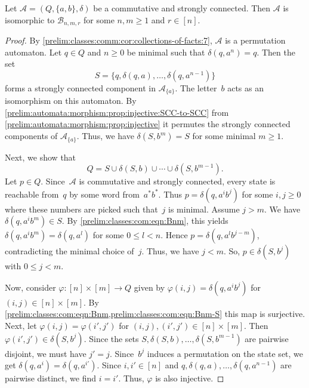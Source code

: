 \begin{proposition} \label{prelim:classes:com:prop:comm-perm-classifiy0}
	Let $\mathcal A = (Q, \{a,b\}, \delta)$ be a commutative and strongly connected.
	Then $\mathcal A$ is isomorphic to 
	$\mathcal B_{n,m,r}$ for some $n,m \ge 1$
	and $r \in [n]$.
\end{proposition}
\begin{proof}
	By \cref{prelim:classes:comm:cor:collections-of-facts:7}, $\mathcal A$
	is a permutation automaton.
	Let $q \in Q$
	and $n \ge 0$ be minimal
	such that $\delta(q, a^n) = q$.
	Then the set 
	\begin{equation}\label{prelim:classes:com:eqn:Bnm}
	S = \{q, \delta(q, a), \ldots, \delta(q, a^{n-1})\}
	\end{equation}
	forms a strongly connected component in $\mathcal A_{\{a\}}$.
	The letter~$b$ acts as an isomorphism on this automaton.
	By \cref{prelim:automata:morphism:prop:injective:SCC-to-SCC} from \cref{prelim:automata:morphism:prop:injective}
	it permutes the strongly connected components of $\mathcal A_{\{a\}}$.
	Thus, we have $\delta(S, b^m) = S$ for some minimal $m \ge 1$.  
        
    Next, we show that
    \begin{equation}\label{prelim:classes:com:eqn:Bnm-S}
    Q = S \cup \delta(S, b) \cup \cdots \cup \delta(S, b^{m-1}).
    \end{equation}
    Let $p \in Q$.
    Since~$\mathcal A$ is commutative and strongly connected,
	every state is reachable from~$q$ by some word from~$a^* b^*$.
	Thus $p = \delta(q, a^i b^j)$ for some $i,j \ge 0$
	where these numbers are picked such that~$j$ is minimal.
	Assume $j > m$.
	We have $\delta(q, a^i b^m) \in S$.
	By \cref{prelim:classes:com:eqn:Bnm}, this yields $\delta(q, a^i b^m) = \delta(q, a^l)$ for some $0 \le l < n$.
	Hence $p = \delta(q, a^l b^{j - m})$, contradicting the minimal choice of~$j$.
	Thus, we have $j < m$. So, $p \in \delta(S, b^j)$ with $0 \le j < m$.

	Now, consider $\varphi \colon [n] \times [m] \to Q$
	given by $\varphi(i,j) = \delta(q, a^i b^j)$
	for $(i,j) \in [n] \times [m]$. By \cref{prelim:classes:com:eqn:Bnm,prelim:classes:com:eqn:Bnm-S}
	this map is surjective.	Next, let
	$\varphi(i,j) = \varphi(i', j')$ for $(i,j), (i',j') \in [n] \times [m]$.
	Then $\varphi(i',j') \in \delta(S, b^j)$.
	Since the sets $S, \delta(S, b), \ldots, \delta(S, b^{m-1})$
	are pairwise disjoint,
	we must have $j' = j$.
	Since~$b^j$ induces a permutation on the state set,
	we get $\delta(q, a^i) = \delta(q, a^{i'})$.
	Since $i,i' \in [n]$ and $q, \delta(q,a), \ldots, \delta(q,a^{n-1})$
	are pairwise distinct, we find $i = i'$.
	Thus, $\varphi$ is also injective.
	

\end{proof}
